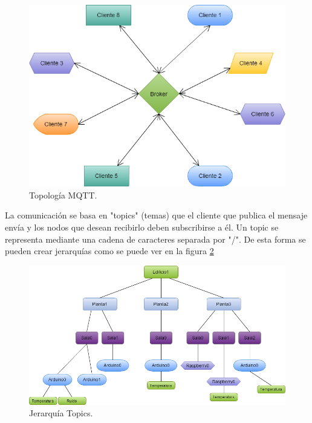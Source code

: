 \documentclass[12pt, twoside]{book}
\begin{document}
\begin{figure}[h!]
\centering
\includegraphics[scale=0.3]{images/topologia.png}
\caption{Topología MQTT.}\label{L401}
\end{figure}
\newpage
La comunicación se basa en "topics" (temas) que el cliente que publica el mensaje envía y los nodos que desean recibirlo deben subscribirse a él. Un topic se representa mediante una cadena de caracteres separada por "/". De esta forma se pueden crear jerarquías como se puede ver en la figura \ref{L402} \
\begin{figure}[h!]
\centering
\includegraphics[scale=0.3]{images/jerarquia.png}
\caption{Jerarquía Topics.}\label{L402}
\end{figure}
\end{document}
